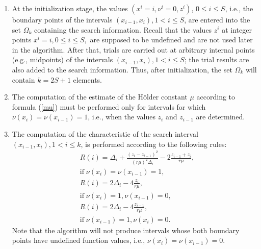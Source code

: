 \documentclass[iicol]{sn-jnl}
\theoremstyle{thmstyleone}%
\theoremstyle{thmstyletwo}%
\theoremstyle{thmstylethree}%
\begin{document}
\begin{enumerate}[1.]
\item At the initialization stage, the values $(x^i = i, \nu^i=0, z^i)$, $ 0\leq i \leq S$, i.e., the boundary points of the intervals $(x_{i-1},x_i), 1<i\leq S$, are entered into the set $\Omega_k$ containing the search  information.
\textcolor[rgb]{0,0,1}{Recall that the values $z^i$ at integer points $x^i=i, 0\leq i \leq S,$ are supposed to be undefined and are not used later in the algorithm.}
After that, trials are carried out at arbitrary internal points (e.g., midpoints) of the intervals $(x_{i-1},x_i), 1<i\leq S$; the trial results are also added to the search information. Thus, after initialization, the set $\Omega_k$ will contain $k=2S+1$ elements.

\item The computation of the estimate of the H\"older constant $\mu$ according to formula (\ref{mu}) must be performed only for intervals for which $\nu(x_i) = \nu(x_{i-1}) = 1$, i.e., when the values $z_i$ and $z_{i-1}$ are determined.

\item The computation of the characteristic of the search interval $(x_{i-1},x_i), 1<i\leq k$, is performed according to the following rules:
\begin{equation}\label{R_int}
\begin{aligned}
&R(i) = \Delta_i + \frac{(z_i-z_{i-1})^2}{(r\mu)^2\Delta_i}-2\frac{z_{i-1}+z_i}{r\mu},\\
&\mathrm{if} \; \nu(x_i) = \nu(x_{i-1}) = 1,  \\ 
&R(i) = 2\Delta_i-4\frac{z_i}{r\mu},\\
&\mathrm{if} \; \nu(x_i) = 1, \nu(x_{i-1}) = 0,  \\ 
&R(i) = 2\Delta_i-4\frac{z_{i-1}}{r\mu},\\
&\mathrm{if} \; \nu(x_{i-1}) = 1, \nu(x_{i}) = 0. \nonumber
\end{aligned}
\end{equation}
Note that the algorithm will not produce intervals whose both boundary points have undefined function values, i.e., $\nu(x_i) = \nu(x_{i-1}) = 0$.


\end{enumerate}
\end{document}
